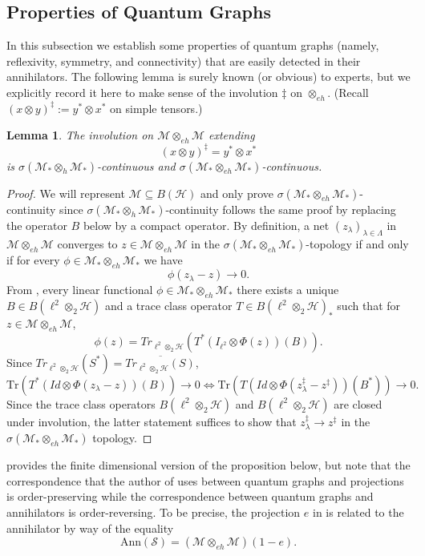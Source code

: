 \documentclass[12pt]{article}
\newtheorem{lemma}[theorem]{Lemma}
\theoremstyle{definition}
\newcommand{\mc}[1]{\mathcal{#1}}
\newcommand{\<}{\langle}
\renewcommand{\>}{\rangle}
\newcommand{\Ann}{\text{Ann}}
\renewcommand{\subset}{\subseteq}
\newcommand{\eh}{\otimes_{eh}}
\newcommand{\Tr}{\text{Tr}}
\begin{document}
\subsection{Properties of Quantum Graphs} \label{subsec: qgraph properties}

In this subsection we establish some properties of quantum graphs (namely, reflexivity, symmetry, and connectivity) that are easily detected in their annihilators. The following lemma is surely known (or obvious) to experts, but we explicitly record it here to make sense of the involution $\ddagger$ on $\eh$. (Recall $(x \otimes y)^\ddagger := y^* \otimes x^*$ on simple tensors.)

\begin{lemma} \label{lem: inv-cty}
    The involution on $\mc M \eh \mc M$ extending 
    \[
    (x \otimes y)^\ddagger  = y^* \otimes x^*
    \]
    is $\sigma(\mc M_* \otimes_{h} \mc M_*)$-continuous and $\sigma(\mc M_* \otimes_{eh} \mc M_*)$-continuous.
\end{lemma}
\begin{proof}
    We will represent $\mc M \subset B(\mc H)$ and only prove $\sigma(\mc M_* \otimes_{eh} \mc M_*)$-continuity since $\sigma(\mc M_* \otimes_{h} \mc M_*)$-continuity follows the same proof by replacing the operator $B$ below by a compact operator. By definition, a net $(z_\lambda)_{\lambda \in \Lambda}$ in $\mc M \eh \mc M$ converges to $z \in \mc M \eh \mc M$ in the $\sigma(\mc M_* \eh \mc M_*)$-topology if and only if for every $\phi \in \mc M_* \eh \mc M_*$ we have
    \[
    \phi(z_\lambda - z) \to 0.
    \]
    From \cite[Lemma 2.3]{gp-obs}, every linear functional $\phi \in \mc M_* \otimes_{eh} \mc M_*$ there exists a unique $B \in B(\ell^2 \otimes_2 \mc H)$ and a trace class operator $T \in B(\ell^2 \otimes_2 \mc H)_*$ such that for $z \in \mc M \eh \mc M$,
    \[
    \phi(z) = Tr_{\ell^2 \otimes_2 \mc H} (T^*(I_{\ell^2} \otimes \Phi(z))(B)).
    \]
    Since $Tr_{\ell^2 \otimes_2 \mc H}(S^*) = \overline{Tr_{\ell^2 \otimes_2 \mc H}(S)}$,
    \[
    \Tr(T^*(Id \otimes \Phi(z_\lambda - z))(B))\to 0 \iff \Tr(T(Id \otimes \Phi(z_\lambda^\ddagger - z^\ddagger))(B^*))\to 0.
    \]
    Since the trace class operators $B(\ell^2 \otimes_2 \mc H)$ and $B(\ell^2 \otimes_2 \mc H)$ are closed under involution, the latter statement suffices to show that $z_\lambda^\ddagger \to z^\ddagger$ in the $\sigma(\mc M_* \eh \mc M_*)$ topology.
\end{proof}

\cite[Corollary 5.13]{daws} provides the finite dimensional version of the proposition below, but note that the correspondence that the author of \cite{daws} uses between quantum graphs and projections is order-preserving while the correspondence between quantum graphs and  annihilators is order-reversing. To be precise, the projection $e$ in \cite[Corollary 5.13]{daws} is related to the annihilator by way of the equality
\[
\Ann(\mc S) = (\mc M \otimes_{eh} \mc M)(1-e).
\]
\end{document}
